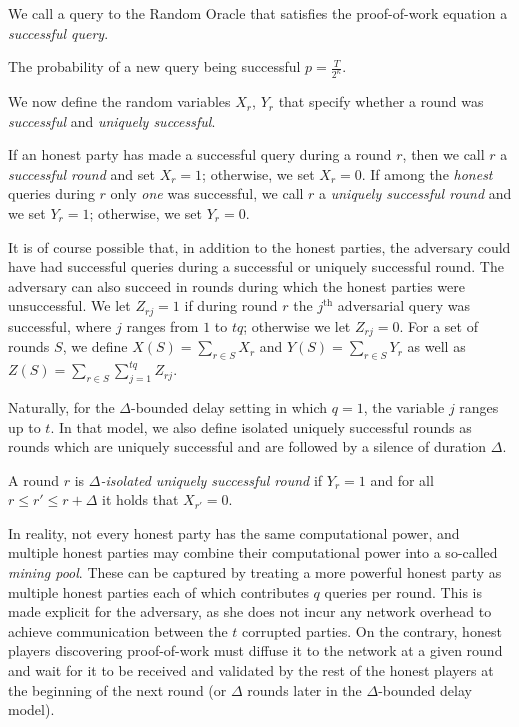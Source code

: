 \begin{definition}
We call a query to the Random Oracle that satisfies
the proof-of-work equation a \emph{successful query}.
\end{definition}

\begin{lemma}
The probability of a new query being successful $p = \frac{T}{2^\kappa}$.
\end{lemma}

We now define the random variables $X_r$, $Y_r$ that specify whether a round
was \emph{successful} and \emph{uniquely successful}.

\begin{definition}
If an honest party has made a successful query during a round $r$, then we call
$r$ a \emph{successful round} and set $X_r = 1$; otherwise, we set $X_r = 0$.
If among the \emph{honest} queries during $r$ only
\emph{one} was successful, we call $r$ a \emph{uniquely successful round}
and we set $Y_r = 1$; otherwise, we set $Y_r = 0$.
\end{definition}

It is of course possible that, in addition to the honest parties, the adversary
could have had successful queries during a successful or uniquely successful
round. The adversary can also succeed in rounds during which the honest parties
were unsuccessful. We let $Z_{rj} = 1$ if during round $r$ the $j^\text{th}$
adversarial query was successful, where $j$ ranges from $1$ to $tq$; otherwise
we let $Z_{rj} = 0$. For a set of rounds $S$, we define
$X(S) = \sum_{r \in S}X_r$ and $Y(S) = \sum_{r \in S}Y_r$ as well as
$Z(S) = \sum_{r \in S}\sum_{j = 1}^{tq} Z_{rj}$.

Naturally, for the $\Delta$-bounded delay setting in which $q = 1$, the variable
$j$ ranges up to $t$. In that model, we also define isolated uniquely successful
rounds as rounds which are uniquely successful and are followed by a silence of
duration $\Delta$.

\begin{definition}
A round $r$ is \emph{$\Delta$-isolated uniquely successful round} if $Y_r = 1$
and for all $r \leq r' \leq r + \Delta$ it holds that $X_{r'} = 0$.
\end{definition}

In reality, not every honest party has the same computational power, and
multiple honest parties may combine their computational power into a so-called
\emph{mining pool}. These can be captured by treating a more powerful honest
party as multiple honest parties each of which contributes $q$ queries per
round. This is made explicit for the adversary, as she does not incur any
network overhead to achieve communication between the $t$ corrupted parties. On
the contrary, honest players discovering proof-of-work must diffuse it to the
network at a given round and wait for it to be received and validated by the
rest of the honest players at the beginning of the next round (or $\Delta$
rounds later in the $\Delta$-bounded delay model).


